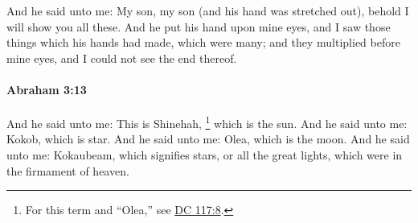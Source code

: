 			And he said unto me: My son, my son (and his hand was stretched out), behold I will show you all these.  And he put his hand upon mine eyes, and I saw those things which his hands had made, which were many; and they multiplied before mine eyes, and I could not see the end thereof.


		\paragraph{Abraham 3:13} %
			\label{ABRAHAM-3-13}

			And he said unto me: This is Shinehah,%
				\footnote{%
					For this term and ``Olea,'' see \hyperref[DC117-8]{DC 117:8}.
					} 
			which is the sun.  And he said unto me: Kokob, which is star.  And he said unto me: Olea, which is the moon.  And he said unto me: Kokaubeam, which signifies stars, or all the great lights, which were in the firmament of heaven.


